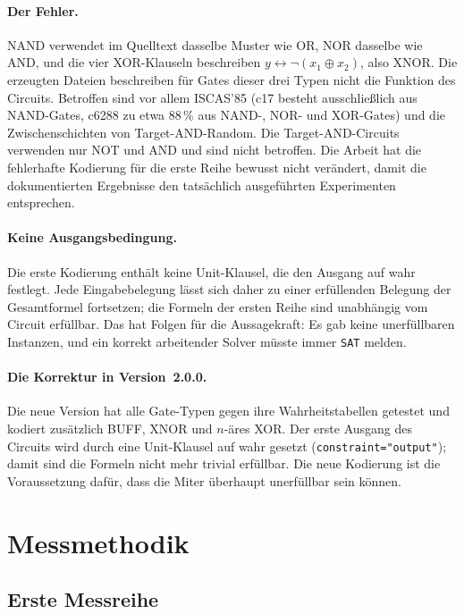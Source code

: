 \paragraph{Der Fehler.} NAND verwendet im Quelltext dasselbe Muster wie OR, NOR dasselbe wie AND, und die vier XOR-Klauseln beschreiben $y\leftrightarrow\neg(x_1\oplus x_2)$, also XNOR. Die erzeugten Dateien beschreiben für Gates dieser drei Typen nicht die Funktion des Circuits. Betroffen sind vor allem ISCAS'85 (c17 besteht ausschließlich aus NAND-Gates, c6288 zu etwa $88\,\%$ aus NAND-, NOR- und XOR-Gates) und die Zwischenschichten von Target-AND-Random. Die Target-AND-Circuits verwenden nur NOT und AND und sind nicht betroffen. Die Arbeit hat die fehlerhafte Kodierung für die erste Reihe bewusst nicht verändert, damit die dokumentierten Ergebnisse den tatsächlich ausgeführten Experimenten entsprechen.

\paragraph{Keine Ausgangsbedingung.} Die erste Kodierung enthält keine Unit-Klausel, die den Ausgang auf wahr festlegt. Jede Eingabebelegung lässt sich daher zu einer erfüllenden Belegung der Gesamtformel fortsetzen; die Formeln der ersten Reihe sind unabhängig vom Circuit erfüllbar. Das hat Folgen für die Aussagekraft: Es gab keine unerfüllbaren Instanzen, und ein korrekt arbeitender Solver müsste immer \texttt{SAT} melden.

\paragraph{Die Korrektur in Version~2.0.0.} Die neue Version hat alle Gate-Typen gegen ihre Wahrheitstabellen getestet und kodiert zusätzlich BUFF, XNOR und $n$-äres XOR. Der erste Ausgang des Circuits wird durch eine Unit-Klausel auf wahr gesetzt (\texttt{constraint="output"}); damit sind die Formeln nicht mehr trivial erfüllbar. Die neue Kodierung ist die Voraussetzung dafür, dass die Miter überhaupt unerfüllbar sein können.

\section{Messmethodik}
\label{sec:exp_messung}

\subsection{Erste Messreihe}

